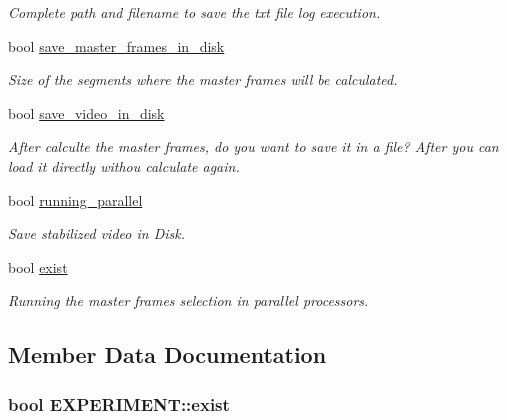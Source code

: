 \begin{DoxyCompactItemize}
\begin{DoxyCompactList}\small\item\em Complete path and filename to save the txt file log execution. \end{DoxyCompactList}\item 
bool \hyperlink{structEXPERIMENT_a665b9063cc9475513a16db5b1c7f10a1}{save\+\_\+master\+\_\+frames\+\_\+in\+\_\+disk}
\begin{DoxyCompactList}\small\item\em Size of the segments where the master frames will be calculated. \end{DoxyCompactList}\item 
bool \hyperlink{structEXPERIMENT_aa392d503b8f79c0d0ee6168226245dd1}{save\+\_\+video\+\_\+in\+\_\+disk}
\begin{DoxyCompactList}\small\item\em After calculte the master frames, do you want to save it in a file? After you can load it directly withou calculate again. \end{DoxyCompactList}\item 
bool \hyperlink{structEXPERIMENT_a74a95ad0fdb8e786e1555bcb4053af2e}{running\+\_\+parallel}
\begin{DoxyCompactList}\small\item\em Save stabilized video in Disk. \end{DoxyCompactList}\item 
bool \hyperlink{structEXPERIMENT_aa8613784c631982322461aff04a6e838}{exist}
\begin{DoxyCompactList}\small\item\em Running the master frames selection in parallel processors. \end{DoxyCompactList}\end{DoxyCompactItemize}


\subsection{Member Data Documentation}
\subsubsection[{\texorpdfstring{exist}{exist}}]{\setlength{\rightskip}{0pt plus 5cm}bool E\+X\+P\+E\+R\+I\+M\+E\+N\+T\+::exist}\hypertarget{structEXPERIMENT_aa8613784c631982322461aff04a6e838}{}\label{structEXPERIMENT_aa8613784c631982322461aff04a6e838}


